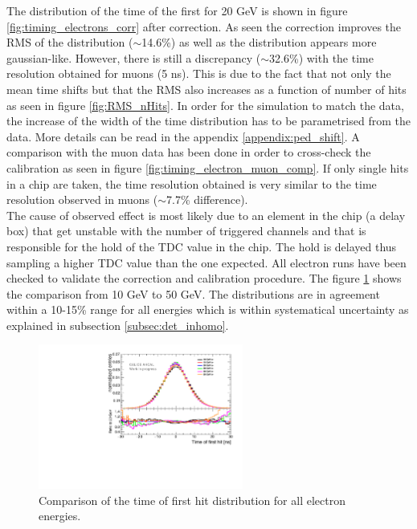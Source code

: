 The distribution of the time of the first for 20 GeV is shown in figure \ref{fig:timing_electrons_corr} after correction. As seen the correction improves the RMS of the distribution ($\sim$14.6\%) as well as the distribution appears more gaussian-like. However, there is still a discrepancy ($\sim$32.6\%) with the time resolution obtained for muons (5 ns). This is due to the fact that not only the mean time shifts but that the RMS also increases as a function of number of hits as seen in figure \ref{fig:RMS_nHits}. In order for the simulation to match the data, the increase of the width of the time distribution has to be parametrised from the data. More details can be read in the appendix \ref{appendix:ped_shift}. A comparison with the muon data has been done in order to cross-check the calibration as seen in figure \ref{fig:timing_electron_muon_comp}. If only single hits in a chip are taken, the time resolution obtained is very similar to the time resolution observed in muons ($\sim$7.7\% difference).\\
The cause of observed effect is most likely due to an element in the chip (a delay box) that get unstable with the number of triggered channels and that is responsible for the hold of the TDC value in the chip. The hold is delayed thus sampling a higher TDC value than the one expected. All electron runs have been checked to validate the correction and calibration procedure. The figure \ref{fig:all_electron_energies} shows the comparison from 10 GeV to 50 GeV. The distributions are in agreement within a 10-15\% range for all energies which is within systematical uncertainty as explained in subsection \ref{subsec:det_inhomo}.

\begin{figure}[htbp]
\begin{center}
\includegraphics[width=0.6\textwidth]{fig/Electrons/ComparisonDataEnergies.pdf}
\caption{Comparison of the time of first hit distribution for all electron energies.}
\label{fig:all_electron_energies}
\end{center}
\end{figure}

